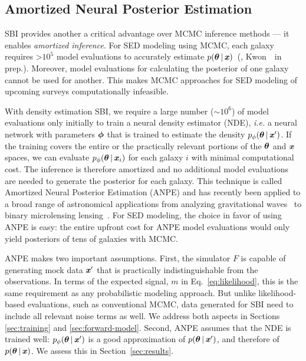 \subsection{Amortized Neural Posterior Estimation} \label{sec:flow}
SBI provides another a critical advantage over MCMC inference methods --- it
enables \emph{amortized inference}. 
For SED modeling using MCMC, each galaxy requires >$10^5$ model evaluations to
accurately estimate $p(\boldsymbol{\theta} \,|\, \textbf{\textit{x}})$~(\citealt{hahn2022}, 
Kwon~\etal~in prep.).
Moreover, model evaluations for calculating the posterior of one galaxy cannot
be used for another. 
This makes MCMC approaches for SED modeling of upcoming surveys computationally
infeasible.

With density estimation SBI, we require a large number (${\sim}10^6$) of model
evaluations only initially to train a neural density estimator (NDE), 
\emph{i.e.} a neural network with parameters $\boldsymbol{\phi}$ that is trained to
estimate the density $p_\phi(\boldsymbol{\theta} \,|\, \textbf{\textit{x}}')$.
If the training covers the entire or the practically relevant portions of the
$\boldsymbol{\theta}$ and $\textbf{\textit{x}}$ spaces, we can evaluate
$p_\phi(\boldsymbol{\theta}\,|\,\textbf{\textit{x}}_i)$ for each galaxy $i$ with minimal computational
cost. 
The inference is therefore amortized and no additional model evaluations are
needed to generate the posterior for each galaxy.
This technique is called  Amortized Neural Posterior Estimation (ANPE) 
and has recently been applied to a broad range of astronomical applications
from analyzing gravitational waves~\citep[\emph{e.g.}][]{wong2020,dax2021} to
binary microlensing lensing~\citep{zhang2021}.
For SED modeling, the choice in favor of using ANPE is easy: the entire upfront
cost for ANPE model evaluations would only yield posteriors of tens of galaxies
with MCMC.

ANPE makes two important assumptions.
First, the simulator $F$ is capable of generating mock data $\textbf{\textit{x}}'$ that is
practically indistinguishable from the observations.
In terms of the expected signal, $m$ in Eq.~\ref{eq:likelihood}, this is the
same requirement as any probabilistic modeling approach. 
But unlike likelihood-based evaluations, such as conventional MCMC, data
generated for SBI need to include all relevant noise terms as well. 
We address both aspects in Sections \ref{sec:training} and \ref{sec:forward-model}.
Second, ANPE assumes that the NDE is trained well: 
$p_\phi(\boldsymbol{\theta} \,|\, \textbf{\textit{x}}')$ is a good approximation of 
$p(\boldsymbol{\theta} \,|\, \textbf{\textit{x}}')$, and therefore of $p(\boldsymbol{\theta} \,|\, \textbf{\textit{x}})$. 
We assess this in Section~\ref{sec:results}.


